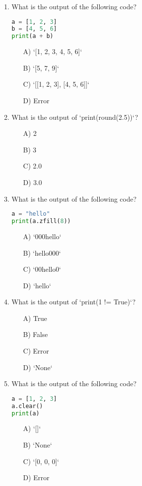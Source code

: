 \documentclass[9pt]{article}
\begin{document}
\begin{multicols}{2}
\begin{enumerate}
\item What is the output of the following code?
\begin{lstlisting}[language=Python]
a = [1, 2, 3]
b = [4, 5, 6]
print(a + b)
\end{lstlisting}
\begin{enumerate}
\item[A)] `[1, 2, 3, 4, 5, 6]`
\item[B)] `[5, 7, 9]`
\item[C)] `[[1, 2, 3], [4, 5, 6]]`
\item[D)] Error
\end{enumerate}

\item What is the output of `print(round(2.5))`?
\begin{enumerate}
\item[A)] 2
\item[B)] 3
\item[C)] 2.0
\item[D)] 3.0
\end{enumerate}

\item What is the output of the following code?
\begin{lstlisting}[language=Python]
a = "hello"
print(a.zfill(8))
\end{lstlisting}
\begin{enumerate}
\item[A)] `000hello`
\item[B)] `hello000`
\item[C)] `00hello0`
\item[D)] `hello`
\end{enumerate}

\item What is the output of `print(1 != True)`?
\begin{enumerate}
\item[A)] True
\item[B)] False
\item[C)] Error
\item[D)] `None`
\end{enumerate}

\item What is the output of the following code?
\begin{lstlisting}[language=Python]
a = [1, 2, 3]
a.clear()
print(a)
\end{lstlisting}
\begin{enumerate}
\item[A)] `[]`
\item[B)] `None`
\item[C)] `[0, 0, 0]`
\item[D)] Error
\end{enumerate}


\end{enumerate}
\end{multicols}
\end{document}
